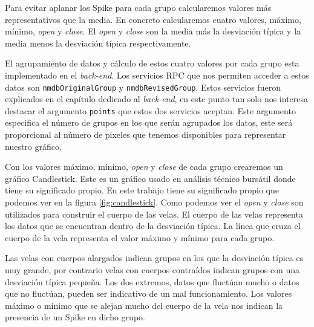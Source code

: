 	\par
	Para evitar aplanar los Spike para cada grupo calcularemos valores más representativos que la media. En concreto calcularemos cuatro valores,
	máximo, mínimo, \emph{open} y \emph{close}. El \emph{open} y \emph{close} son la media más la desviación típica y la media menos la desviación
	típica respectivamente.
	\par
	El agrupamiento de datos y cálculo de estos cuatro valores por cada grupo esta implementado en el \emph{back-end}. Los servicios RPC que nos
	permiten acceder a estos datos son \texttt{nmdbOriginalGroup} y \texttt{nmdbRevisedGroup}. Estos servicios fueron explicados en el capítulo
	dedicado al \emph{back-end}, en este punto tan solo nos interesa destacar el argumento \texttt{points} que estos dos servicios aceptan. Este
	argumento especifica el número de grupos en los que serán agrupados los datos, este será proporcional al número de pixeles que tenemos
	disponibles para representar nuestro gráfico. 
	\par
	Con los valores máximo, mínimo, \emph{open} y \emph{close} de cada grupo crearemos un gráfico Candlestick. Este es un gráfico usado en
	análisis técnico bursátil donde tiene su significado propio. En este trabajo tiene su significado propio que podemos ver en la figura
	\ref{fig:candlestick}. Como podemos ver el \emph{open} y \emph{close} son utilizados para construir el cuerpo de las velas. El cuerpo de las
	velas representa los datos que se encuentran dentro de la desviación típica. La línea que cruza el cuerpo de la vela representa el valor
	máximo y mínimo para cada grupo.
	\par
	Las velas con cuerpos alargados indican grupos en los que la desviación típica es muy grande, por contrario velas con cuerpos contraídos
	indican grupos con una desviación típica pequeña. Los dos extremos, datos que fluctúan mucho o datos que no fluctúan, pueden ser indicativo de
	un mal funcionamiento. Los valores máximo o mínimo que se alejan mucho del cuerpo de la vela nos indican la presencia de un Spike en dicho
	grupo. 

